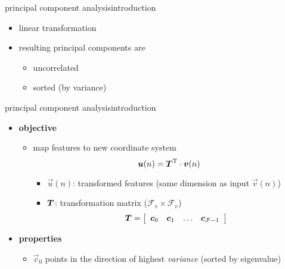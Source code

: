 
\begin{frame}{principal component analysis}{introduction}
    \begin{itemize}
        \item   linear transformation
        \item   resulting principal components are 
					\begin{itemize}
						\item uncorrelated
						\item	sorted (by variance)
					\end{itemize}
    \end{itemize}
\end{frame}

\begin{frame}{principal component analysis}{introduction}
				\begin{itemize}
						\item   \textbf{objective}
								\begin{itemize}
										\item   map features to new coordinate system
												\begin{equation*}\label{eq:pca_an}
														\vec{u}(n) = \mat{T}^\mathrm{T}\cdot\vec{v}(n) 
												\end{equation*}
												\begin{itemize}
														\item   $\vec{u}(n)$: transformed features (same dimension as input $\vec{v}(n)$)
														\item   $\mat{T}$: transformation matrix ($\mathcal{F}_v\times\mathcal{F}_v$)	
																\begin{equation*}
																		\mat{T} =   \left[ 
																										\begin{array}{cccc}
																										\vec{c}_0 & \vec{c}_1 & \ldots & \vec{c}_{\mathcal{F}-1}\\
																										\end{array}  
																								\right] 
																\end{equation*}
												\end{itemize}
								\end{itemize}
						\item<2->   \textbf{properties}
								\begin{itemize}
										\item	$\vec{c}_0$ points in the direction of  highest \emph{variance} (sorted by eigenvalue)

\end{itemize}
\end{itemize}
\end{frame}
